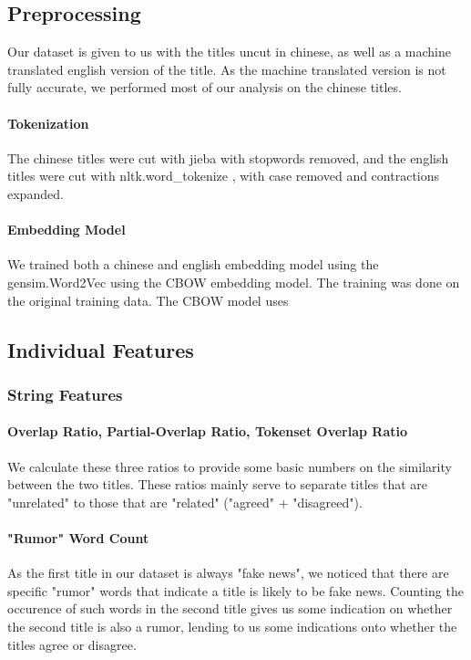 \documentclass[a4paper, 12pt]{article}
\begin{document}
\begin{multicols}{2}
            \subsection{Preprocessing}
            Our dataset is given to us with the titles uncut in chinese, as well as a machine translated english version of the title. As the machine translated version is not fully accurate, we performed most of our analysis on the chinese titles.

            \paragraph*{Tokenization} The chinese titles were cut with jieba \cite{jieba} with stopwords removed, and the english titles were cut with nltk.word\_tokenize \cite{nltk}, with case removed and contractions expanded.

            \paragraph*{Embedding Model} We trained both a chinese and english embedding model using the gensim.Word2Vec \cite{gensim} using the CBOW embedding model. The training was done on the original training data. The CBOW model uses

        \subsection{Individual Features}
            \subsubsection{String Features}
                \paragraph*{Overlap Ratio, Partial-Overlap Ratio, Tokenset Overlap Ratio} We calculate these three ratios to provide some basic numbers on the similarity between the two titles. These ratios mainly serve to separate titles that are "unrelated" to those that are "related" ("agreed" + "disagreed").

                \paragraph*{"Rumor" Word Count} As the first title in our dataset is always "fake news", we noticed that there are specific "rumor" words that indicate a title is likely to be fake news. Counting the occurence of such words in the second title gives us some indication on whether the second title is also a rumor, lending to us some indications onto whether the titles agree or disagree.
            

\end{multicols}
\end{document}
